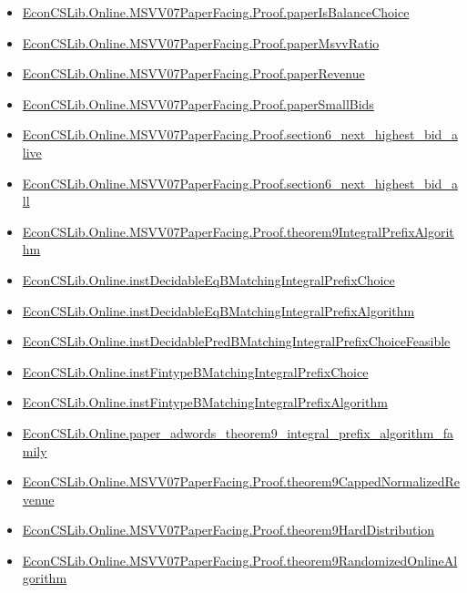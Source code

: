 \documentclass[10pt]{article}
\begin{document}
\begin{itemize}[leftmargin=1.2em]
\begin{itemize}[leftmargin=1.2em]
\item \hyperlink{library-prerequisite-6ceb3e3f4d17db2d}{EconCSLib.Online.MSVV07PaperFacing.Proof.paperIsBalanceChoice}
\item \hyperlink{library-prerequisite-f40fee6a826dfefe}{EconCSLib.Online.MSVV07PaperFacing.Proof.paperMsvvRatio}
\item \hyperlink{library-prerequisite-7e65e7e61fdbc5d4}{EconCSLib.Online.MSVV07PaperFacing.Proof.paperRevenue}
\item \hyperlink{library-prerequisite-e286750c32becd63}{EconCSLib.Online.MSVV07PaperFacing.Proof.paperSmallBids}
\item \hyperlink{library-prerequisite-d67bddad88fd5ca1}{EconCSLib.Online.MSVV07PaperFacing.Proof.section6\_next\_highest\_bid\_alive}
\item \hyperlink{library-prerequisite-23ed12927a6416aa}{EconCSLib.Online.MSVV07PaperFacing.Proof.section6\_next\_highest\_bid\_all}
\item \hyperlink{library-prerequisite-ead52041b03214df}{EconCSLib.Online.MSVV07PaperFacing.Proof.theorem9IntegralPrefixAlgorithm}
\item \hyperlink{library-prerequisite-3468674b8fe8593f}{EconCSLib.Online.instDecidableEqBMatchingIntegralPrefixChoice}
\item \hyperlink{library-prerequisite-9c8dd38c7b561e37}{EconCSLib.Online.instDecidableEqBMatchingIntegralPrefixAlgorithm}
\item \hyperlink{library-prerequisite-4764383ce21c006f}{EconCSLib.Online.instDecidablePredBMatchingIntegralPrefixChoiceFeasible}
\item \hyperlink{library-prerequisite-bcc38a877f7d1f19}{EconCSLib.Online.instFintypeBMatchingIntegralPrefixChoice}
\item \hyperlink{library-prerequisite-3edd2eb24104f0dd}{EconCSLib.Online.instFintypeBMatchingIntegralPrefixAlgorithm}
\item \hyperlink{library-prerequisite-800fb469338172ef}{EconCSLib.Online.paper\_adwords\_theorem9\_integral\_prefix\_algorithm\_family}
\item \hyperlink{library-prerequisite-98692da0f5a310ef}{EconCSLib.Online.MSVV07PaperFacing.Proof.theorem9CappedNormalizedRevenue}
\item \hyperlink{library-prerequisite-e6850519fcd21d73}{EconCSLib.Online.MSVV07PaperFacing.Proof.theorem9HardDistribution}
\item \hyperlink{library-prerequisite-d18c6f1eee281edc}{EconCSLib.Online.MSVV07PaperFacing.Proof.theorem9RandomizedOnlineAlgorithm}

\end{itemize}
\end{itemize}
\end{document}
